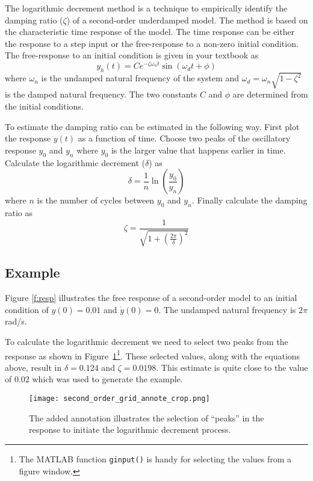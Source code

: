 The logarithmic decrement method is a technique to empirically identify the damping ratio ($\zeta$) of a second-order underdamped model.  The method is based on the characteristic time response of the model.  The time response can be either the response to a step input or the free-response to a non-zero initial condition.  The free-response to an initial condition is given in your textbook as
\begin{equation}
y_h(t)=C e^{-\zeta\omega_nt}\sin\left(\omega_dt+\phi\right) 
\end{equation}
where $\omega_n$ is the undamped natural frequency of the system and $\omega_d=\omega_n\sqrt{1-\zeta^2}$ is the damped natural frequency.  The two constants $C$ and $\phi$ are determined from the initial conditions.

To estimate the damping ratio can be estimated in the following way.  First plot the response $y(t)$ as a function of time.  Choose two peaks of the oscillatory response $y_0$ and $y_n$ where $y_0$ is the larger value that happens earlier in time.  Calculate the logarithmic decrement ($\delta$) as
\[ \delta = \frac{1}{n}\ln\left(\frac{y_0}{y_n}\right) \]
where $n$ is the number of cycles between $y_0$ and $y_n$.
Finally calculate the damping ratio as
\[ \zeta = \frac{1}{\sqrt{1+\left(\frac{2\pi}{\delta}\right)^2}} \]

\subsection*{Example}
Figure \ref{f:resp} illustrates the free response of a second-order model to an initial condition of $y(0)=0.01$ and $\dot{y}(0)=0$.  The undamped natural frequency is $2 \pi$ rad/s.


To calculate the logarithmic decrement we need to select two peaks from the response as shown in Figure~\ref{f:resp2}\footnote{The MATLAB function \texttt{ginput()} is handy for selecting the values from a figure window.}. These selected values, along with the equations above, result in $\delta=0.124$ and $\zeta=0.0198$.  This estimate is quite close to the value of 0.02 which was used to generate the example.

\begin{figure}[h!bt]
\centerline{
{\texttt{[image: second\_order\_grid\_annote\_crop.png]}}}
\caption{The added annotation illustrates the selection of ``peaks'' in the response to initiate the logarithmic decrement process.}
\label{f:resp2}
\end{figure}

